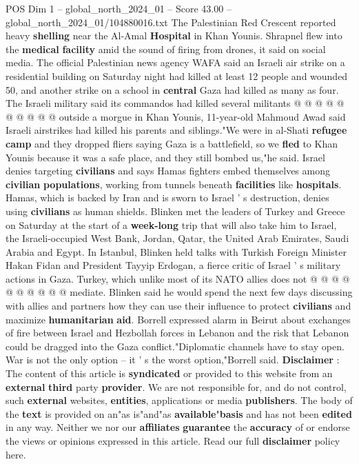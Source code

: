 \begin{textsample}{POS Dim 1 – global\_north\_2024\_01 – Score 43.00 – global\_north\_2024\_01/104880016.txt}
The Palestinian Red Crescent reported heavy \textbf{shelling} near the Al-Amal \textbf{Hospital} in Khan Younis.
Shrapnel flew into the \textbf{medical} \textbf{facility} amid the sound of firing from drones, it said on social media.
The official Palestinian news agency WAFA said an Israeli air strike on a residential building on Saturday night had killed at least 12 people and wounded 50, and another strike on a school in \textbf{central} Gaza had killed as many as four.
The Israeli military said its commandos had killed several militants @ @ @ @ @ @ @ @ @ @ outside a morgue in Khan Younis, 11-year-old Mahmoud Awad said Israeli airstrikes had killed his parents and siblings."We were in al-Shati \textbf{refugee} \textbf{camp} and they dropped fliers saying Gaza is a battlefield, so we \textbf{fled} to Khan Younis because it was a safe place, and they still bombed us,"he said.
Israel denies targeting \textbf{civilians} and says Hamas fighters embed themselves among \textbf{civilian} \textbf{populations}, working from tunnels beneath \textbf{facilities} like \textbf{hospitals}.
Hamas, which is backed by Iran and is sworn to Israel ' s destruction, denies using \textbf{civilians} as human shields.
Blinken met the leaders of Turkey and Greece on Saturday at the start of a \textbf{week-long} trip that will also take him to Israel, the Israeli-occupied West Bank, Jordan, Qatar, the United Arab Emirates, Saudi Arabia and Egypt.
In Istanbul, Blinken held talks with Turkish Foreign Minister Hakan Fidan and President Tayyip Erdogan, a fierce critic of Israel ' s military actions in Gaza.
Turkey, which unlike most of its NATO allies does not @ @ @ @ @ @ @ @ @ @ mediate.
Blinken said he would spend the next few days discussing with allies and partners how they can use their influence to protect \textbf{civilians} and maximize \textbf{humanitarian} \textbf{aid}.
Borrell expressed alarm in Beirut about exchanges of fire between Israel and Hezbollah forces in Lebanon and the risk that Lebanon could be dragged into the Gaza conflict."Diplomatic channels have to stay open.
War is not the only option -- it ' s the worst option,"Borrell said. \textbf{Disclaimer} : The content of this article is \textbf{syndicated} or provided to this website from an \textbf{external} \textbf{third} party \textbf{provider}.
We are not responsible for, and do not control, such \textbf{external} websites, \textbf{entities}, applications or media \textbf{publishers}.
The body of the \textbf{text} is provided on an"as is"and"as \textbf{available}"\textbf{basis} and has not been \textbf{edited} in any way.
Neither we nor our \textbf{affiliates} \textbf{guarantee} the \textbf{accuracy} of or endorse the views or opinions expressed in this article.
Read our full \textbf{disclaimer} policy here.


\end{textsample}
